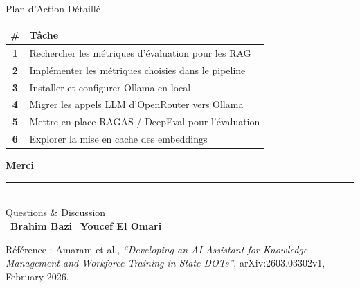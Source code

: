 \documentclass[aspectratio=169]{beamer}
\begin{document}
\begin{frame}{Plan d'Action Détaillé}
  \begin{center}
  \renewcommand{\arraystretch}{1.4}
  \small
  \begin{tabular}{>{\bfseries}c l }
    \toprule
    \textbf{\#} & \textbf{Tâche} \\
    \midrule
    1 & Rechercher les métriques d'évaluation pour les RAG \\
    2 & Implémenter les métriques choisies dans le pipeline \\
    3 & Installer et configurer Ollama en local \\
    4 & Migrer les appels LLM d'OpenRouter vers Ollama \\
    5 & Mettre en place RAGAS / DeepEval pour l'évaluation \\
    6 & Explorer la mise en cache des embeddings \\
    \bottomrule
  \end{tabular}
  \end{center}
\end{frame}

{
\begin{frame}[plain]
  \vfill
  \begin{center}
    {\Huge\textbf{\textcolor{primary}{Merci}}}\\[0.5cm]
    \rule{6cm}{0.4pt}\\[0.4cm]
    {\large Questions \& Discussion}\\[0.8cm]
    \faUser\ \textbf{Brahim Bazi} \qquad \faUser\ \textbf{Youcef El Omari}
  \end{center}
  \vfill
  \begin{block}{}
    \centering\footnotesize
    Référence : Amaram et al., \textit{``Developing an AI Assistant for Knowledge Management and Workforce Training in State DOTs''}, arXiv:2603.03302v1, February 2026.
  \end{block}
\end{frame}
}
\end{document}
